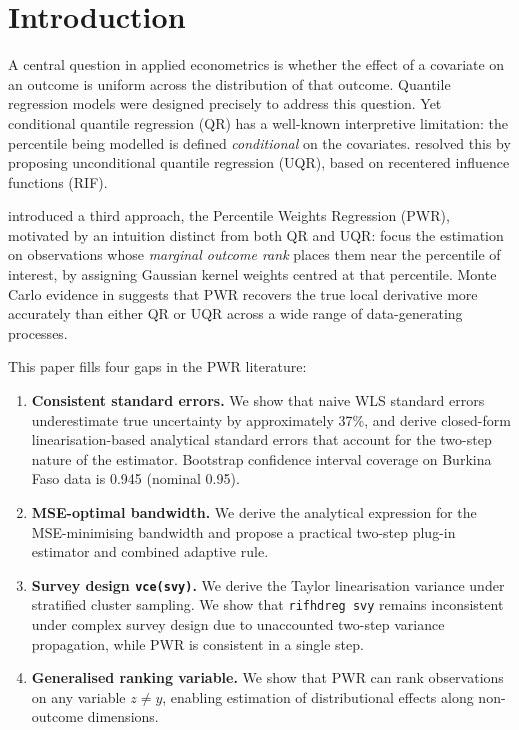 \documentclass[12pt,a4paper]{article}
\theoremstyle{definition}
\begin{document}
\newpage\tableofcontents\newpage

\section{Introduction}
\label{sec:intro}

A central question in applied econometrics is whether the effect of a
covariate on an outcome is uniform across the distribution of that
outcome. Quantile regression models \citep{KoenkerBassett1978} were
designed precisely to address this question. Yet conditional quantile
regression (QR) has a well-known interpretive limitation: the percentile
being modelled is defined \textit{conditional} on the covariates.
\citet{FirpoFortinLemieux2009} resolved this by proposing unconditional
quantile regression (UQR), based on recentered influence functions (RIF).

\citet{Araar2016} introduced a third approach, the Percentile Weights
Regression (PWR), motivated by an intuition distinct from both QR and
UQR: focus the estimation on observations whose \textit{marginal outcome
rank} places them near the percentile of interest, by assigning Gaussian
kernel weights centred at that percentile. Monte Carlo evidence in
\citet{Araar2023} suggests that PWR recovers the true local derivative
more accurately than either QR or UQR across a wide range of
data-generating processes.

This paper fills four gaps in the PWR literature:
\begin{enumerate}[label=(\roman*)]
  \item \textbf{Consistent standard errors.} We show that naive WLS
  standard errors underestimate true uncertainty by approximately 37\%,
  and derive closed-form linearisation-based analytical standard errors
  that account for the two-step nature of the estimator. Bootstrap
  confidence interval coverage on Burkina Faso data is 0.945 (nominal
  0.95).
  \item \textbf{MSE-optimal bandwidth.} We derive the analytical
  expression for the MSE-minimising bandwidth and propose a practical
  two-step plug-in estimator and combined adaptive rule.
  \item \textbf{Survey design \texttt{vce(svy)}.} We derive the Taylor
  linearisation variance under stratified cluster sampling. We show that
  \texttt{rifhdreg svy} \citep{RiosAvila2020} remains inconsistent under
  complex survey design due to unaccounted two-step variance propagation,
  while PWR is consistent in a single step.
  \item \textbf{Generalised ranking variable.} We show that PWR can rank
  observations on any variable $z \neq y$, enabling estimation of
  distributional effects along non-outcome dimensions.
\end{enumerate}
\end{document}
